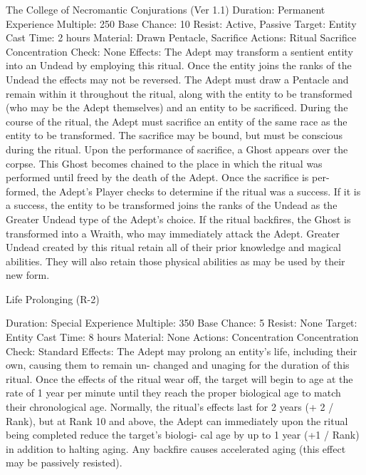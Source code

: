 \begin{Chapter}{The College of Necromantic Conjurations (Ver 1.1)}
Duration: Permanent 
Experience Multiple: 250 
Base Chance: 10%
Resist: Active, Passive 
Target: Entity 
Cast Time: 2 hours 
Material: Drawn Pentacle, Sacrifice 
Actions: Ritual Sacrifice 
Concentration Check: None 
Effects: The Adept may transform a sentient entity 
into an Undead by employing this ritual. Once the 
entity joins the ranks of the Undead the effects may 
not  be  reversed.  The  Adept  must  draw  a  Pentacle 
and  remain  within  it  throughout  the  ritual,  along 
with the entity to be transformed (who may be the 
Adept  themselves)  and  an  entity  to  be  sacrificed. 
During  the  course  of  the  ritual,  the  Adept  must 
sacrifice an entity of the same race as the entity to 
be  transformed.  The  sacrifice  may  be  bound,  but 
must  be  conscious  during  the  ritual.  Upon  the 
performance of sacrifice, a Ghost appears over the 
corpse. This Ghost becomes chained to the place in 
which  the  ritual  was  performed  until  freed  by  the 
death  of  the  Adept.  Once  the  sacrifice  is  per-
formed,  the  Adept’s  Player  checks  to  determine  if 
the ritual was a success. If it is a success, the entity 
to be transformed joins the ranks of the Undead as 
the  Greater  Undead  type  of  the  Adept’s  choice.  If 
the ritual backfires, the Ghost is transformed into a 
Wraith,  who  may  immediately  attack  the  Adept. 
Greater  Undead  created  by  this  ritual  retain  all  of 
their  prior  knowledge  and  magical  abilities.  They 
will  also  retain  those  physical  abilities  as  may  be 
used by their new form. 

Life Prolonging (R-2) 

Duration: Special 
Experience Multiple: 350 
Base Chance: 5%
Resist: None 
Target: Entity 
Cast Time: 8 hours 
Material: None 
Actions: Concentration 
Concentration Check: Standard 
Effects:  The  Adept  may  prolong  an  entity’s  life, 
including  their  own,  causing  them  to  remain  un-
changed and unaging for the duration of this ritual. 
Once  the  effects  of  the  ritual  wear  off,  the  target 
will  begin  to  age  at  the  rate  of  1  year  per  minute 
until they reach the proper biological age to match 
their  chronological  age.  Normally,  the  ritual’s 
effects last for 2 years (+ 2 / Rank), but at Rank 10 
and  above,  the  Adept  can  immediately  upon  the 
ritual  being  completed  reduce  the  target’s  biologi-
cal  age  by  up  to  1  year  (+1  /  Rank)  in  addition to 
halting  aging.  Any  backfire  causes  accelerated 
aging (this effect may be passively resisted). 


\end{Chapter}
